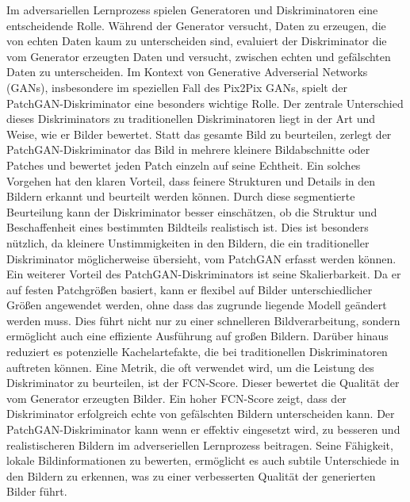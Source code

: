 Im adversariellen Lernprozess spielen Generatoren und Diskriminatoren eine entscheidende Rolle. Während der Generator versucht, Daten zu erzeugen, die von echten Daten kaum zu unterscheiden sind, evaluiert der Diskriminator die vom Generator erzeugten Daten und versucht, zwischen echten und gefälschten Daten zu unterscheiden.\newline
Im Kontext von Generative Adverserial Networks (GANs), insbesondere im speziellen Fall des Pix2Pix GANs, spielt der PatchGAN-Diskriminator eine besonders wichtige Rolle. Der zentrale Unterschied dieses Diskriminators zu traditionellen Diskriminatoren liegt in der Art und Weise, wie er Bilder bewertet. Statt das gesamte Bild zu beurteilen, zerlegt der PatchGAN-Diskriminator das Bild in mehrere kleinere Bildabschnitte oder Patches und bewertet jeden Patch einzeln auf seine Echtheit. \newline
Ein solches Vorgehen hat den klaren Vorteil, dass feinere Strukturen und Details in den Bildern erkannt und beurteilt werden können. Durch diese segmentierte Beurteilung kann der Diskriminator besser einschätzen, ob die Struktur und Beschaffenheit eines bestimmten Bildteils realistisch ist. Dies ist besonders nützlich, da kleinere Unstimmigkeiten in den Bildern, die ein traditioneller Diskriminator möglicherweise übersieht, vom PatchGAN erfasst werden können. \newline
Ein weiterer Vorteil des PatchGAN-Diskriminators ist seine Skalierbarkeit. Da er auf festen Patchgrößen basiert, kann er flexibel auf Bilder unterschiedlicher Größen angewendet werden, ohne dass das zugrunde liegende Modell geändert werden muss. Dies führt nicht nur zu einer schnelleren Bildverarbeitung, sondern ermöglicht auch eine effiziente Ausführung auf großen Bildern. Darüber hinaus reduziert es potenzielle Kachelartefakte, die bei traditionellen Diskriminatoren auftreten können.\newline
Eine Metrik, die oft verwendet wird, um die Leistung des Diskriminator zu beurteilen, ist der FCN-Score. Dieser bewertet die Qualität der vom Generator erzeugten Bilder. Ein hoher FCN-Score zeigt, dass der Diskriminator erfolgreich echte von gefälschten Bildern unterscheiden kann. \newline
Der PatchGAN-Diskriminator kann wenn er effektiv eingesetzt wird, zu besseren und realistischeren Bildern im adverseriellen Lernprozess beitragen. Seine Fähigkeit, lokale Bildinformationen zu bewerten, ermöglicht es auch subtile Unterschiede in den Bildern zu erkennen, was zu einer verbesserten Qualität der generierten Bilder führt.